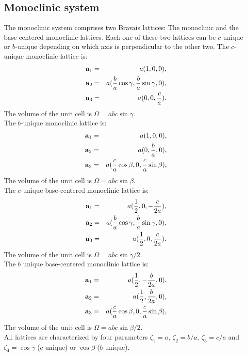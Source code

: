 \documentclass[12pt,a4paper]{article}
\begin{document}
\subsection{\color{web-blue}Monoclinic system}
The monoclinic system comprises two Bravais lattices:
The monoclinic and the base-centered monoclinic lattices.
Each one of these two lattices can be $c$-unique or $b$-unique depending on
which axis is perpendicular to the other two. 
The $c$-unique monoclinic lattice is:
\begin{eqnarray}
{\bf a}_1 &=& a (1, 0, 0), \nonumber \\
{\bf a}_2 &=& a ({b \over a} \cos{\gamma}, {b \over a}\sin{\gamma}, 0), \nonumber \\
{\bf a}_3 &=& a (0, 0, {c \over a}). 
\nonumber
\end{eqnarray}
The volume of the unit cell is $\Omega = abc \sin\gamma$. \\
The $b$-unique monoclinic lattice is:
\begin{eqnarray}
{\bf a}_1 &=& a (1, 0, 0), \nonumber \\
{\bf a}_2 &=& a (0, {b \over a}, 0), \nonumber \\
{\bf a}_3 &=& a ({c \over a} \cos{\beta}, 0, {c \over a}\sin{\beta}), \nonumber 
\end{eqnarray}
The volume of the unit cell is $\Omega = abc \sin\beta$. \\
The $c$-unique base-centered monoclinic lattice is:
\begin{eqnarray}
{\bf a}_1 &=& a ({1\over 2}, 0, -{c \over 2 a}), \nonumber \\
{\bf a}_2 &=& a ({b \over a} \cos{\gamma}, {b \over a}\sin{\gamma}, 0), \nonumber \\
{\bf a}_3 &=& a ({1\over 2}, 0, {c \over 2 a}). 
\nonumber
\end{eqnarray}
The volume of the unit cell is $\Omega = abc \sin\gamma/2$. \\
The $b$ unique base-centered monoclinic lattice is:
\begin{eqnarray}
{\bf a}_1 &=& a ({1\over 2}, -{b \over 2 a}, 0), \nonumber \\
{\bf a}_2 &=& a ({1\over 2}, {b \over 2 a}, 0), \nonumber \\
{\bf a}_3 &=& a ({c \over a} \cos{\beta}, 0, {c \over a}\sin{\beta}), \nonumber 
\end{eqnarray}
The volume of the unit cell is $\Omega = abc \sin\beta/2$. \\
All lattices are characterized by four parameters $\zeta_1=a$, $\zeta_2=b/a$,
$\zeta_3=c/a$ and $\zeta_4=\cos\gamma$
($c$-unique) or $\cos\beta$ ($b$-unique).
\end{document}
